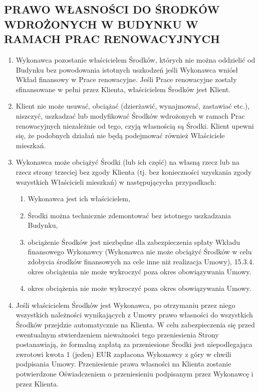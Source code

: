 \begin{multicols}{2}
\subsection{PRAWO WŁASNOŚCI DO ŚRODKÓW WDROŻONYCH W BUDYNKU W RAMACH PRAC RENOWACYJNYCH}
\begin{enumerate}
	\item Wykonawca pozostanie właścicielem Środków, których nie można oddzielić od Budynku bez powodowania istotnych uszkodzeń jeśli Wykonawca wniósł Wkład finansowy w Prace renowacyjne. Jeśli Prace renowacyjne zostały sfinansowane w pełni przez Klienta, właścicielem Środków jest Klient.
	\item Klient nie może usuwać, obciążać (dzierżawić, wynajmować, zastawiać etc.), niszczyć, uszkadzać lub modyfikować Środków wdrożonych w ramach Prac renowacyjnych niezależnie od tego, czyją własnością są Środki. Klient upewni się, że podobnych działań nie będą podejmować również Właściciele mieszkań.
	\item Wykonawca może obciążyć Środki (lub ich część) na własną rzecz lub na rzecz strony trzeciej bez zgody Klienta (tj. bez konieczności uzyskania zgody wszystkich Właścicieli mieszkań) w następującycha przypadkach:
	\begin{enumerate}
		\item Wykonawca jest ich właścicielem,
		\item Środki można technicznie zdemontować bez istotnego uszkadzania Budynku,
		\item obciążenie Środków jest niezbędne dla zabezpieczenia spłaty Wkładu finansowego Wykonawcy (Wykonawca nie może obciążyć Środków w celu zdobycia środków finansowych na cele inne niż realizacja Umowy), 15.3.4. okres obciążenia nie może wykroczyć poza okres obowiązywania Umowy.
		\item okres obciążenia nie może wykroczyć poza okres obowiązywania Umowy.
	\end{enumerate}
	\item Jeśli właścicielem Środków jest Wykonawca, po otrzymaniu przez niego wszystkich należności wynikających z Umowy prawo własności do wszystkich Środków przejdzie automatycznie na Klienta. W celu zabezpieczenia się przed ewentualnym stwierdzeniem nieważności tego przeniesienia Strony postanawiają, że formalną zapłatą za przeniesione Środki jest niepodlegająca zwrotowi kwota 1 (jeden) EUR zapłacona Wykonawcy z góry w chwili podpisania Umowy. Przeniesienie prawa własności na Klienta zostanie potwierdzone Oświadczeniem o przeniesieniu podpisanym przez Wykonawcę i przez Klienta.
\end{enumerate}


\end{multicols}
